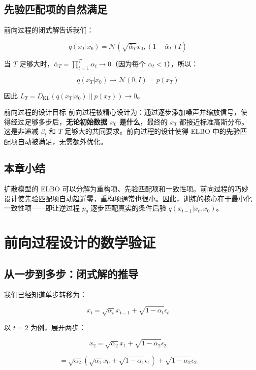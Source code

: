 \documentclass[a4paper]{article}
\begin{document}
\subsection{先验匹配项的自然满足}

前向过程的闭式解告诉我们：

$$q(x_T | x_0) = \mathcal{N}(\sqrt{\bar{\alpha}_T} x_0, (1-\bar{\alpha}_T) I)$$

当 $T$ 足够大时，$\bar{\alpha}_T = \prod_{t=1}^T \alpha_t \to 0$（因为每个 $\alpha_t < 1$），所以：

$$q(x_T | x_0) \to \mathcal{N}(0, I) = p(x_T)$$

因此 $L_T = D_{\text{KL}}(q(x_T|x_0) \| p(x_T)) \to 0$。

\begin{importantbox}{前向过程的设计目标}
前向过程被精心设计为：通过逐步添加噪声并缩放信号，使得经过足够多步后，\textbf{无论初始数据 $x_0$ 是什么}，最终的 $x_T$ 都接近标准高斯分布。这是非递减 $\beta_t$ 和 $T$ 足够大的共同要求。前向过程的设计使得 ELBO 中的先验匹配项自动被满足，无需额外优化。
\end{importantbox}

\subsection{本章小结}

扩散模型的 ELBO 可以分解为重构项、先验匹配项和一致性项。前向过程的巧妙设计使先验匹配项自动趋近零，重构项通常也很小。因此，训练的核心在于最小化一致性项——即让逆过程 $p_\theta$ 逐步匹配真实的条件后验 $q(x_{t-1}|x_t, x_0)$。


\section{前向过程设计的数学验证}

\subsection{从一步到多步：闭式解的推导}

我们已经知道单步转移为：

$$x_t = \sqrt{\alpha_t} x_{t-1} + \sqrt{1 - \alpha_t} \epsilon_t$$

以 $t=2$ 为例，展开两步：

$$x_2 = \sqrt{\alpha_2} x_1 + \sqrt{1-\alpha_2} \epsilon_2$$

$$= \sqrt{\alpha_2}(\sqrt{\alpha_1} x_0 + \sqrt{1-\alpha_1} \epsilon_1) + \sqrt{1-\alpha_2} \epsilon_2$$
\end{document}
